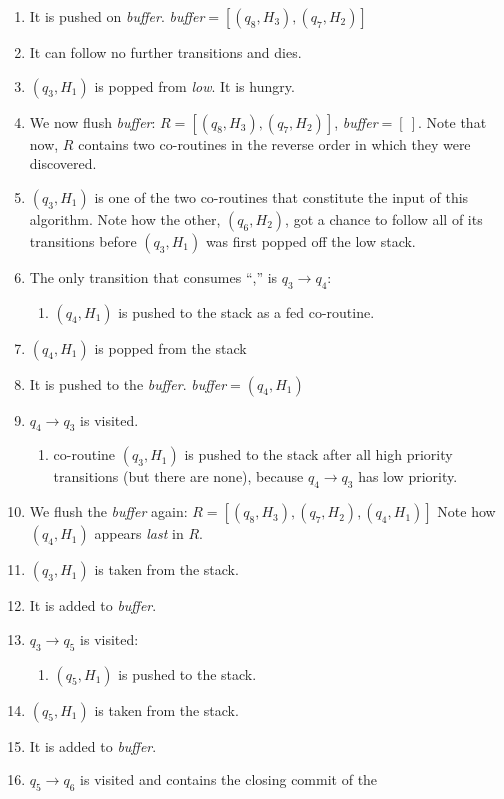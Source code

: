 \documentclass[11pt,a4paper,twoside,openright]{Thesis}
\theoremstyle{definition}
\begin{document}
\begin{example}
\begin{enumerate}
\item It is pushed on \emph{buffer}. \emph{buffer}$=[(q_8, H_3), (q_7, H_2)]$
\item It can follow no further transitions and dies.
\item $(q_3, H_1)$ is popped from \emph{low}. It is hungry.
\item We now flush \emph{buffer}:
  $R=[(q_8, H_3), (q_7, H_2)]$, \emph{buffer}$=[\ ]$.  Note that now, $R$
  contains two co-routines in the reverse order in which they were discovered.
\item  $(q_3, H_1)$ is one of the two co-routines that constitute the
	input of this algorithm. Note how the other, $(q_6, H_2)$, got a
	chance to follow all of its transitions before $(q_3, H_1)$ was
	first popped off the low stack.
\item The only transition that consumes ``,'' is $q_3\rightarrow q_4$:\begin{enumerate}
	\item $(q_4, H_1)$ is pushed to the stack as a fed co-routine.
\end{enumerate}
\item $(q_4, H_1)$ is popped from the stack
\item It is pushed to the \emph{buffer}. \emph{buffer}$=(q_4, H_1)$
\item $q_4\rightarrow q_3$ is visited.
\begin{enumerate}
	\item co-routine $(q_3, H_1)$ is pushed to the stack after all high
    priority transitions (but there are none),
    because $q_4\rightarrow q_3$ has low priority.
\end{enumerate}
\item We flush the \emph{buffer} again: $R=[(q_8, H_3), (q_7, H_2), (q_4, H_1)]$
	Note how $(q_4, H_1)$ appears \emph{last} in $R$.
\item $(q_3, H_1)$ is taken from the stack.
\item It is added to \emph{buffer}.
\item $q_3\rightarrow q_5$ is visited:\begin{enumerate}
	\item $(q_5, H_1)$ is pushed to the stack.
\end{enumerate}
\item $(q_5, H_1)$ is taken from the stack.
\item It is added to \emph{buffer}.
\item $q_5\rightarrow q_6$ is visited and contains the closing commit of the

\end{enumerate}
\end{example}
\end{document}
